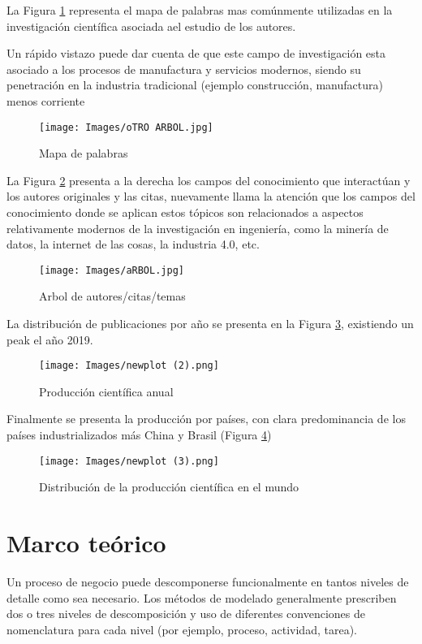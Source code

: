 \documentclass{article}
\begin{document}
La Figura \ref{nube} representa el mapa de palabras mas comúnmente utilizadas en la investigación científica asociada ael estudio de los autores.

Un rápido vistazo puede dar cuenta de que este campo de investigación esta asociado a los procesos de manufactura y servicios modernos, siendo su penetración en la industria tradicional (ejemplo construcción, manufactura) menos corriente

\begin{figure}[H]
\texttt{[image: Images/oTRO ARBOL.jpg]}
\centering
\caption{Mapa de palabras}
\label{nube}
\end{figure}


La Figura \ref{arbolcon} presenta a la derecha los campos del conocimiento que interactúan y los autores originales y las citas, nuevamente llama la atención que los campos del conocimiento donde se aplican estos tópicos son relacionados a aspectos relativamente modernos de la investigación en ingeniería, como la minería de datos, la internet de las cosas, la industria 4.0, etc.



\begin{figure}[H]
\texttt{[image: Images/aRBOL.jpg]}
\centering
\caption{Arbol de autores/citas/temas}
\label{arbolcon}
\end{figure}

La distribución de publicaciones por año se presenta en la Figura \ref{PCA}, existiendo un peak el año 2019.

\begin{figure}[H]
\texttt{[image: Images/newplot (2).png]}
\centering
\caption{Producción científica anual}
\label{PCA}
\end{figure}

Finalmente se presenta la producción por países, con clara predominancia de los países industrializados más China y Brasil (Figura \ref{mundoreal})

\begin{figure}[H]
\texttt{[image: Images/newplot (3).png]}
\centering
\caption{Distribución de la producción científica en el mundo}
\label{mundoreal}
\end{figure}


\section{Marco teórico}

Un proceso de negocio puede descomponerse funcionalmente en tantos niveles de detalle como sea necesario. Los métodos de modelado generalmente prescriben dos o tres niveles de descomposición y uso de diferentes convenciones de nomenclatura para cada nivel (por ejemplo, proceso, actividad, tarea). 
\end{document}
